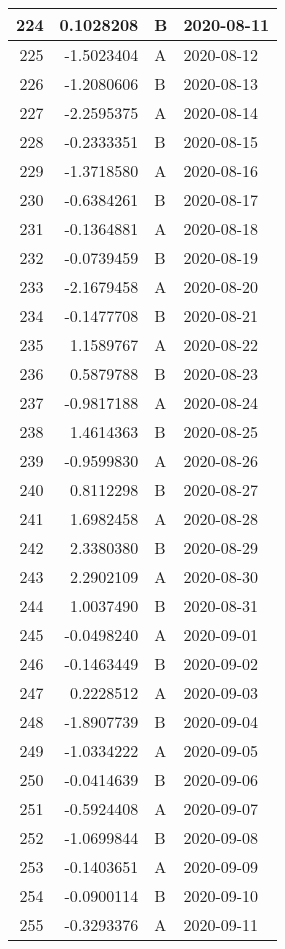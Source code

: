\begin{tabular}{r|r|l|l}
\hline
224 & 0.1028208 & B & 2020-08-11\\
\hline
225 & -1.5023404 & A & 2020-08-12\\
\hline
226 & -1.2080606 & B & 2020-08-13\\
\hline
227 & -2.2595375 & A & 2020-08-14\\
\hline
228 & -0.2333351 & B & 2020-08-15\\
\hline
229 & -1.3718580 & A & 2020-08-16\\
\hline
230 & -0.6384261 & B & 2020-08-17\\
\hline
231 & -0.1364881 & A & 2020-08-18\\
\hline
232 & -0.0739459 & B & 2020-08-19\\
\hline
233 & -2.1679458 & A & 2020-08-20\\
\hline
234 & -0.1477708 & B & 2020-08-21\\
\hline
235 & 1.1589767 & A & 2020-08-22\\
\hline
236 & 0.5879788 & B & 2020-08-23\\
\hline
237 & -0.9817188 & A & 2020-08-24\\
\hline
238 & 1.4614363 & B & 2020-08-25\\
\hline
239 & -0.9599830 & A & 2020-08-26\\
\hline
240 & 0.8112298 & B & 2020-08-27\\
\hline
241 & 1.6982458 & A & 2020-08-28\\
\hline
242 & 2.3380380 & B & 2020-08-29\\
\hline
243 & 2.2902109 & A & 2020-08-30\\
\hline
244 & 1.0037490 & B & 2020-08-31\\
\hline
245 & -0.0498240 & A & 2020-09-01\\
\hline
246 & -0.1463449 & B & 2020-09-02\\
\hline
247 & 0.2228512 & A & 2020-09-03\\
\hline
248 & -1.8907739 & B & 2020-09-04\\
\hline
249 & -1.0334222 & A & 2020-09-05\\
\hline
250 & -0.0414639 & B & 2020-09-06\\
\hline
251 & -0.5924408 & A & 2020-09-07\\
\hline
252 & -1.0699844 & B & 2020-09-08\\
\hline
253 & -0.1403651 & A & 2020-09-09\\
\hline
254 & -0.0900114 & B & 2020-09-10\\
\hline
255 & -0.3293376 & A & 2020-09-11\\

\end{tabular}

